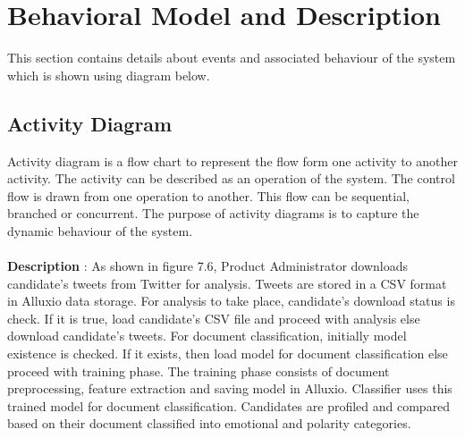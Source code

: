 \documentclass[oneside,a4paper,12pt]{pictreport}
\begin{document}
\section{Behavioral Model and Description}
This section contains details about events and associated behaviour of the system which is shown using diagram below.

\subsection{Activity Diagram}
Activity diagram is a flow chart to represent the flow form one activity to another activity. The activity can be described as an operation of the system. The control flow is drawn from one operation to another. This flow can be sequential, branched or concurrent. The purpose of activity diagrams is to capture the dynamic behaviour of the system.\\\\
\textbf{Description} : As shown in figure 7.6, Product Administrator downloads candidate's tweets from Twitter for analysis. Tweets are stored in a CSV format in Alluxio data storage. For analysis to take place, candidate's download status is check. If it is true, load candidate's CSV file and proceed with analysis else download candidate's tweets. For document classification, initially model existence is checked. If it exists, then load model for document classification else proceed with training phase. The training phase consists of document preprocessing, feature extraction and saving model in Alluxio. Classifier uses this trained model for document classification. Candidates are profiled and compared based on their document classified into emotional and polarity categories.
\end{document}
